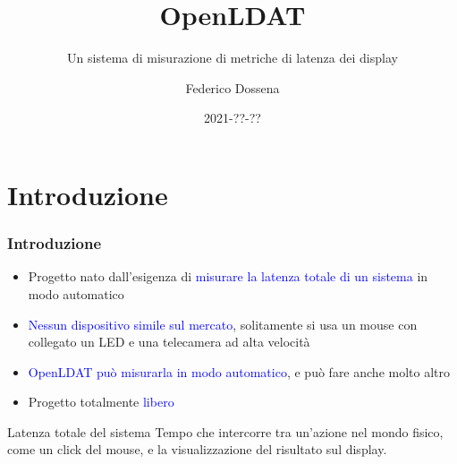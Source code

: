 \documentclass{beamer}
\title{OpenLDAT}
\subtitle{Un sistema di misurazione di metriche di latenza dei display}
\author{Federico Dossena}
\institute{Università degli Studi di Milano}
\date{2021-??-??}
\begin{document}
	
\begin{frame}
	\titlepage
\end{frame}

\section{Introduzione}
\begin{frame}
	\frametitle{Introduzione}
	\begin{itemize}
		\item Progetto nato dall'esigenza di \textcolor{blue}{misurare la latenza totale di un sistema} in modo automatico
		\item \textcolor{blue}{Nessun dispositivo simile sul mercato}, solitamente si usa un mouse con collegato un LED e una telecamera ad alta velocità
		\item \textcolor{blue}{OpenLDAT può misurarla in modo automatico}, e può fare anche molto altro
		\item Progetto totalmente \textcolor{blue}{libero}
	\end{itemize}
	\begin{block}{Latenza totale del sistema}
		Tempo che intercorre tra un'azione nel mondo fisico, come un click del mouse, e la visualizzazione del risultato sul display.
	\end{block}
\end{frame}
\end{document}
